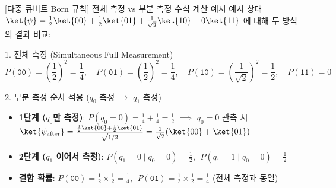 \documentclass[aspectratio=169, 10pt]{beamer}
\begin{document}
\begin{frame}{[다중 큐비트 Born 규칙] 전체 측정 vs 부분 측정 수식 계산 예시}
    예시 상태 $\ket{\psi} = \frac{1}{2}\ket{00} + \frac{1}{2}\ket{01} + \frac{1}{\sqrt{2}}\ket{10} + 0\ket{11}$ 에 대해 두 방식의 결과 비교:
    \vspace{0.15cm}
    \begin{qcblock}{1. 전체 측정 (Simultaneous Full Measurement)}
        $$P(\texttt{00}) = \left(\frac{1}{2}\right)^2 = \frac{1}{4}, \quad P(\texttt{01}) = \left(\frac{1}{2}\right)^2 = \frac{1}{4}, \quad P(\texttt{10}) = \left(\frac{1}{\sqrt{2}}\right)^2 = \frac{1}{2}, \quad P(\texttt{11}) = 0$$
    \end{qcblock}
    \pause
    \vspace{0.1cm}
    \begin{qctip}{2. 부분 측정 순차 적용 ($q_0$ 측정 $\to$ $q_1$ 측정)}
        \begin{itemize}
            \item \textbf{1단계 ($q_0$만 측정)}: $P(q_0=0) = \frac{1}{4} + \frac{1}{4} = \frac{1}{2}$ $\implies$ $q_0=0$ 관측 시 $\ket{\psi_{\text{after}}} = \frac{\frac{1}{2}\ket{00}+\frac{1}{2}\ket{01}}{\sqrt{1/2}} = \frac{1}{\sqrt{2}}(\ket{00}+\ket{01})$
            \pause
            \item \textbf{2단계 ($q_1$ 이어서 측정)}: $P(q_1=0 \mid q_0=0) = \frac{1}{2}$, $\; P(q_1=1 \mid q_0=0) = \frac{1}{2}$
            \pause
            \item \textbf{결합 확률}: $P(\texttt{00}) = \frac{1}{2}\times\frac{1}{2} = \frac{1}{4}$, $\; P(\texttt{01}) = \frac{1}{2}\times\frac{1}{2} = \frac{1}{4}$ (전체 측정과 동일)
        \end{itemize}
    \end{qctip}
\end{frame}
\end{document}
